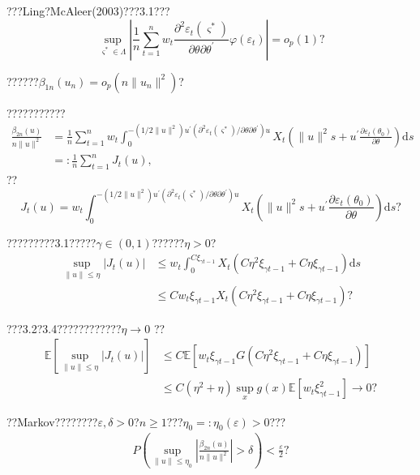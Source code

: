\documentclass[a4paper,12pt,openany,oneside,utf-8]{ctexbook}
\begin{document}
	\noindent ???Ling?McAleer(2003)???3.1???
	$$
	\sup _{\varsigma^{*} \in \Lambda}\left|\frac{1}{n} \sum_{t=1}^{n} w_{t} \frac{\partial^{2} \varepsilon_{t}\left(\varsigma^{*}\right)}{\partial \theta \partial \theta^{\prime}}\varphi(\varepsilon_t)\right|=o_{p}(1)\mbox{?}
	$$
	
	\noindent ??????$\beta_{1n}(u_n)=o_p(n\|u_n\|^2)$?
	
	???????????
	\begin{align}
		\frac{\beta_{2 n}(u)}{n\|u\|^2}&=\frac{1}{n} \sum_{t=1}^{n} w_{t} \int_{0}^{-\left(1 / 2\|u\|^{2}\right) u^{\prime}\left(\partial^{2} \varepsilon_{t}\left(\varsigma^{*}\right) / \partial \theta \partial \theta^{\prime}\right) u} X_{t}\left(\|u\|^{2} s+u^{\prime} \frac{\partial \varepsilon_{t}\left(\theta_{0}\right)}{\partial \theta}\right)\mathrm{d}s\nonumber\\
		&=: \frac{1}{n} \sum_{t=1}^{n} J_{t}(u),\nonumber
	\end{align}
	??
	$$J_{t}(u)=w_{t} \int_{0}^{-\left(1 / 2\|u\|^{2}\right) u^{\prime}\left(\partial^{2} \varepsilon_{t}\left(\varsigma^{*}\right) / \partial \theta \partial \theta^{\prime}\right) u} X_{t}\left(\|u\|^{2} s+u^{\prime} \frac{\partial \varepsilon_{t}\left(\theta_{0}\right)}{\partial \theta}\right)\mathrm{d}s\mbox{?}
	$$
	
	\noindent ?????????3.1?????$\gamma\in(0,1)$??????$\eta>0$?
	\begin{align}
		\sup _{\|u\| \leq \eta}\left|J_{t}(u)\right|&\le w_{t} \int_{0}^{C \xi_{\gamma t-1}}X_{t}\left(C \eta^{2} \xi_{\gamma t-1}+C \eta \xi_{\gamma t-1}\right)\mathrm{d}s\nonumber\\
		&\le Cw_{t}\xi_{\gamma t-1}X_{t}\left(C \eta^{2} \xi_{\gamma t-1}+C \eta \xi_{\gamma t-1}\right)\mbox{?}\nonumber
	\end{align}
	
	\noindent ???3.2?3.4????????????$\eta\rightarrow 0$ ??
	\begin{align}
		\mathbb{E}\left[\sup _{\|u\| \leq \eta}\left|J_{t}(u)\right|\right]&\le C\mathbb{E}\left[w_{t}\xi_{\gamma t-1}G\left(C \eta^{2} \xi_{\gamma t-1}+C \eta \xi_{\gamma t-1}\right)\right]\nonumber\\
		&\le C\left(\eta^{2}+\eta\right) \sup _{x} g(x) \mathbb{E}\left[w_{t} \xi_{\gamma t-1}^{2}\right] \rightarrow 0 \mbox{?} \nonumber
	\end{align}
	
	??Markov????????$\varepsilon,\delta>0$?$n\ge 1$???$\eta_0=:\eta_0(\varepsilon)>0$???
	\begin{align}\label{326}
		P\left(\sup _{\|u\| \leq \eta_{0}}\left|\frac{\beta_{2 n}(u)}{n\|u\|^2}\right|>\delta\right) <\frac{\varepsilon}{2}\mbox{?}
	\end{align}
	
\end{document}
